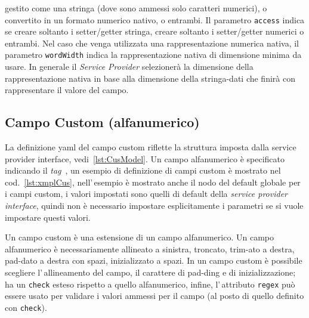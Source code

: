 \documentclass[a4paper,10pt]{report}
\begin{document}
gestito come una stringa (dove sono ammessi solo caratteri numerici), o 
convertito in un formato numerico nativo, o entrambi. Il parametro 
\texttt{access} indica se creare soltanto i setter/getter stringa, creare 
soltanto i setter/getter numerici o entrambi.
Nel caso che venga utilizzata una rappresentazione numerica nativa, il parametro
\texttt{wordWidth} indica la rappresentazione nativa di dimensione minima da 
usare.
In generale il \textsl{Service Provider} selezionerà la dimensione della
rappresentazione nativa in base alla dimensione della stringa-dati che finirà 
con rappresentare il valore del campo.


\subsection{Campo Custom (alfanumerico)} \label{sub:yaml.cus}
La definizione yaml del campo custom riflette la struttura imposta 
dalla service provider interface, vedi~\ref{lst:CusModel}.
Un campo alfanumerico è specificato indicando il \textsl{tag} 
\,, 
un esempio di definizione di campi custom è mostrato nel 
cod.~\ref{lst:xmplCus}, nell'\,esempio è mostrato anche il nodo del default
globale per i campi custom, i valori impostati sono quelli di default
della \textsl{service provider interface}, quindi non è necessario impostare
esplicitamente i parametri se si vuole impostare questi valori.

Un campo custom è una estensione di un campo alfanumerico. Un campo alfanumerico
è necessariamente allineato a sinistra, troncato, trim-ato a destra, pad-dato a
destra con spazi, inizializzato a spazi. In un campo custom è possibile 
scegliere l'\,allineamento del campo, il carattere di  pad-ding e di 
inizializzazione; ha un \texttt{check} esteso rispetto a quello alfanumerico,
infine, l'\,attributo \texttt{regex} può essere usato per validare i valori
ammessi per il campo (al posto di quello definito con \texttt{check}).
\end{document}

